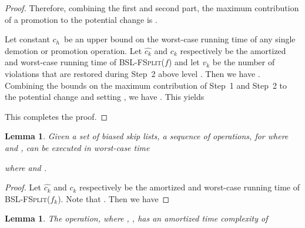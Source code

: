 \documentclass[11pt]{article}
\newcommand{\Bslfsplx}[1]{\mbox{\textsc{BSL-FSplit(\ensuremath{#1})}}}
\newcommand{\cons}[1]{\ensuremath{c_{#1}}}
\newcommand{\cnsh}{\cons h}
\newcommand{\vionum}[1]{\ensuremath{v_{#1}}}
\newcommand{\amcost}[1]{\ensuremath{\hat{c_{#1}}}}
\newcommand{\actcost}[1]{\ensuremath{c_{#1}}}
\newcounter{count}
\newtheorem{lemma}[count]{Lemma}
\begin{document}
\begin{proof}
Therefore, combining the first and second part, the maximum contribution of a promotion to the potential change is . 

Let constant \cnsh\ be an upper bound on the worst-case running time of any single demotion or promotion operation. Let \amcost k and \actcost k respectively be the amortized and worst-case running time of \Bslfsplx{f} and let \vionum k be the number of violations that are restored during Step~2 above level . 
Then we have . 
Combining the bounds on the maximum contribution of Step~1 and Step~2 to the potential change and setting , we have . 
This yields 
 
This completes the proof. 
\end{proof} 



\begin{lemma} 
\label{lem:wccostofbslfsplit} 
Given a set  of biased skip lists, a sequence of  operations, for  where   and , can be executed in worst-case time 
 
 
where  and . 
\end{lemma} 



\begin{proof} 
Let \amcost k and \actcost k respectively be the amortized and worst-case running time of \Bslfsplx{f_k}. Note that . Then we have 
{\allowdisplaybreaks 
 
} 
\end{proof} 


\begin{lemma} 
\label{lem:costofbslfjoin} 
The  operation, where , , has an amortized time complexity of 
  
\end{lemma} 
\end{document}
